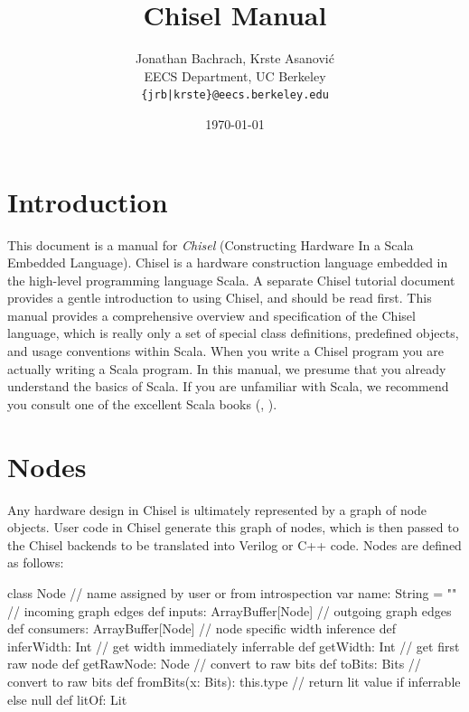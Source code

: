 \documentclass[10pt,twocolumn]{article}
\title{Chisel Manual}
\author{Jonathan Bachrach, Krste Asanovi\'{c} \\
EECS Department, UC Berkeley\\
{\tt  \{jrb|krste\}@eecs.berkeley.edu}
}
\date{\today}
\begin{document}
\maketitle{}




\section{Introduction}

This document is a manual for {\em Chisel} (Constructing Hardware In a
Scala Embedded Language).  Chisel is a hardware construction language
embedded in the high-level programming language Scala.  A separate
Chisel tutorial document provides a gentle introduction to using
Chisel, and should be read first.  This manual provides a
comprehensive overview and specification of the Chisel language, which
is really only a set of special class definitions, predefined objects,
and usage conventions within Scala.  When you write a Chisel program
you are actually writing a Scala program.  In this manual, we presume
that you already understand the basics of Scala.  If you are
unfamiliar with Scala, we recommend you consult one of the excellent
Scala books (\cite{programming-scala}, \cite{programming-in-scala}).

\section{Nodes}

Any hardware design in Chisel is ultimately represented by a graph of
node objects.  User code in Chisel generate this graph of nodes, which
is then passed to the Chisel backends to be translated into Verilog or
C++ code.  Nodes are defined as follows:

\begin{scala}
class Node {
  // name assigned by user or from introspection
  var name: String = ""
  // incoming graph edges
  def inputs: ArrayBuffer[Node]
  // outgoing graph edges
  def consumers: ArrayBuffer[Node]
  // node specific width inference
  def inferWidth: Int
  // get width immediately inferrable
  def getWidth: Int
  // get first raw node
  def getRawNode: Node
  // convert to raw bits 
  def toBits: Bits
  // convert to raw bits 
  def fromBits(x: Bits): this.type
  // return lit value if inferrable else null
  def litOf: Lit
}
\end{scala}
\end{document}
